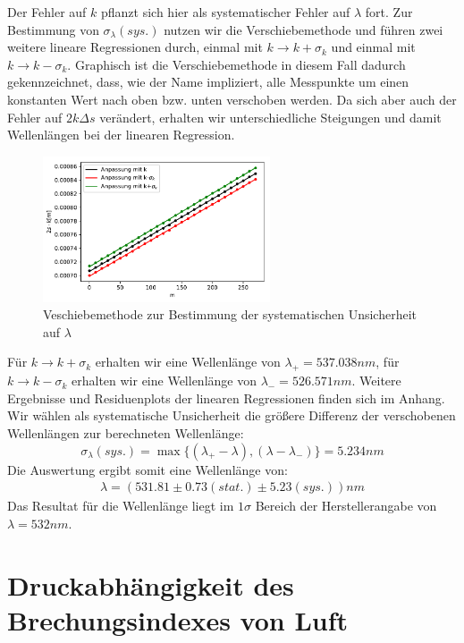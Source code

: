 \documentclass[12pt,a4paper]{article}
\begin{document}
Der Fehler auf $k$ pflanzt sich hier als systematischer Fehler auf $\lambda$ fort. Zur Bestimmung von $\sigma_{\lambda}(sys.)$ nutzen wir die Verschiebemethode und führen zwei weitere lineare Regressionen durch, einmal mit $k\rightarrow k+\sigma_k$ und einmal mit $k\rightarrow k-\sigma_k$. Graphisch ist die Verschiebemethode in diesem Fall dadurch gekennzeichnet, dass, wie der Name impliziert, alle Messpunkte um einen konstanten Wert nach oben bzw. unten verschoben werden. Da sich aber auch der Fehler auf $2k\Delta s$ verändert, erhalten wir unterschiedliche Steigungen und damit Wellenlängen bei der linearen Regression.
\begin{figure}[H]
	\centering
	\includegraphics[width=0.6\textwidth]{Python/Lambdagruen_LinReg4.pdf}
	\caption{Veschiebemethode zur Bestimmung der systematischen Unsicherheit auf $\lambda$}
\end{figure}
Für $k\rightarrow k+\sigma_k$ erhalten wir eine Wellenlänge von $\lambda_+=537.038nm$, für $k\rightarrow k-\sigma_k$ erhalten wir eine Wellenlänge von $\lambda_-=526.571nm$. Weitere Ergebnisse und Residuenplots der linearen Regressionen finden sich im Anhang. Wir wählen als systematische Unsicherheit die größere Differenz der verschobenen Wellenlängen zur berechneten Wellenlänge:
\begin{equation}
\sigma_{\lambda}(sys.)=\max\{(\lambda_+-\lambda),(\lambda-\lambda_-)\}=5.234nm
\end{equation}
Die Auswertung ergibt somit eine Wellenlänge von:
\begin{align*}
\lambda = (531.81 \pm 0.73(stat.) \pm 5.23(sys.)) nm
\end{align*}
Das Resultat für die Wellenlänge liegt im $1\sigma$ Bereich der Herstellerangabe von $\lambda=532nm$.

\section{Druckabhängigkeit des Brechungsindexes von Luft}
\end{document}
